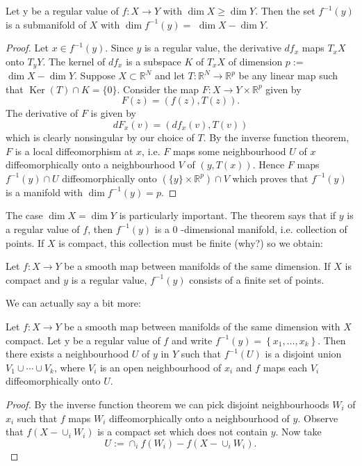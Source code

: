 \documentclass[a4paper, 10pt, twocolumn]{amsart}
\begin{document}
\begin{theorem}
    Let y be a regular value of $f: X \rightarrow Y$ with $\operatorname{dim} X \geq \operatorname{dim} Y$. Then the set $f^{-1}(y)$ is a submanifold of $X$ with $\operatorname{dim} f^{-1}(y)=$ $\operatorname{dim} X-\operatorname{dim} Y$.
\end{theorem}
\begin{proof}
    Let $x \in f^{-1}(y)$. Since $y$ is a regular value, the derivative $d f_{x}$ maps $T_{x} X$ onto $T_{y} Y$. The kernel of $d f_{x}$ is a subspace $K$ of $T_{x} X$ of dimension $p:=$ $\operatorname{dim} X-\operatorname{dim} Y$. Suppose $X \subset \mathbb{R}^{N}$ and let $T: \mathbb{R}^{N} \rightarrow \mathbb{R}^{p}$ be any linear map such that $\operatorname{Ker}(T) \cap K=\{0\}$. Consider the map $F: X \rightarrow Y \times \mathbb{R}^{p}$ given by
$$
F(z)=(f(z), T(z)).
$$
The derivative of $F$ is given by
$$
d F_{x}(v)=\left(d f_{x}(v), T(v)\right)
$$
which is clearly nonsingular by our choice of $T$. By the inverse function theorem, $F$ is a local diffeomorphism at $x$, i.e. $F$ maps some neighbourhood $U$ of $x$ diffeomorphically onto a neighbourhood $V$ of $(y, T(x))$. Hence $F$ maps $f^{-1}(y) \cap U$ diffeomorphically onto $\left(\{y\} \times \mathbb{R}^{p}\right) \cap V$ which proves that $f^{-1}(y)$ is a manifold with $\operatorname{dim} f^{-1}(y)=p$.
\end{proof}

The case $\operatorname{dim} X=\operatorname{dim} Y$ is particularly important. The theorem says that if $y$ is a regular value of $f$, then $f^{-1}(y)$ is a 0 -dimensional manifold, i.e. collection of points. If $X$ is compact, this collection must be finite (why?) so we obtain:

\begin{corollary}
    Let $f: X \rightarrow Y$ be a smooth map between manifolds of the same dimension. If $X$ is compact and $y$ is a regular value, $f^{-1}(y)$ consists of a finite set of points.
\end{corollary}

We can actually say a bit more:

\begin{theorem}
    Let $f: X \rightarrow Y$ be a smooth map between manifolds of the same dimension with $X$ compact. Let y be a regular value of $f$ and write $f^{-1}(y)=\left\{x_{1}, \ldots, x_{k}\right\}$. Then there exists a neighbourhood $U$ of $y$ in $Y$ such that $f^{-1}(U)$ is a disjoint union $V_{1} \cup \cdots \cup V_{k}$, where $V_{i}$ is an open neighbourhood of $x_{i}$ and $f$ maps each $V_{i}$ diffeomorphically onto $U$.
\end{theorem}
\begin{proof}
    By the inverse function theorem we can pick disjoint neighbourhoods $W_{i}$ of $x_{i}$ such that $f$ maps $W_{i}$ diffeomorphically onto a neighbourhood of $y$. Observe that $f\left(X-\cup_{i} W_{i}\right)$ is a compact set which does not contain $y$. Now take
$$
U:=\cap_{i} f\left(W_{i}\right)-f\left(X-\cup_{i} W_{i}\right).
$$
\end{proof}
\end{document}
